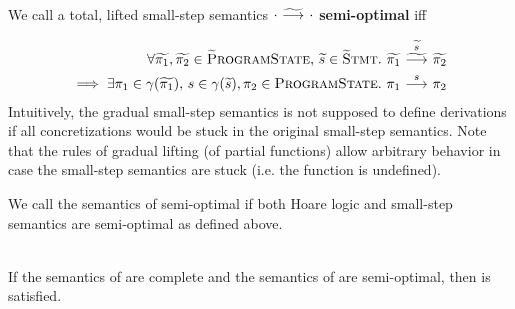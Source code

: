 \begin{definition}~\\
    \label{def:perf-dyn}
    We call a total, lifted small-step semantics $\gsstep{\cdot}{\cdot}$ \textbf{semi-optimal} iff
    \begin{comment}
    \forall \grad{\pi} \in \setGProgramState.~ (\forall \pi \in \gamma(\grad{\pi}).~ \sstepStuck{\pi}) \implies \gsstep{\grad{\pi}}{\pi_{EX}}
    \end{comment}
    \begin{align*}
    \forall \grad{\pi_1}, \grad{\pi_2} \in \setGProgramState,\, \grad{s} \in \setGStmt.&~ \gsstepConsume{\grad{s}}{\grad{\pi_1}}{\grad{\pi_2}}\\ \implies \exists \pi_1 \in \gamma(\grad{\pi_1}),\, s \in \gamma(\grad{s}), \pi_2 \in \setProgramState.&~ \sstepConsume{s}{\pi_1}{\pi_2}
    \end{align*}
    Intuitively, the gradual small-step semantics is not supposed to define derivations if all concretizations would be stuck in the original small-step semantics.
    Note that the rules of gradual lifting (of partial functions) allow arbitrary behavior in case the small-step semantics are stuck (i.e. the function is undefined).
\end{definition}

We call the semantics of \gvl semi-optimal if both Hoare logic and small-step semantics are semi-optimal as defined above.

\begin{theorem}~\\
    \label{thm:compl-and-so-to-gdpres}
    If the semantics of \svl are complete and the semantics of \gvl are semi-optimal, then  is satisfied.
\end{theorem}
